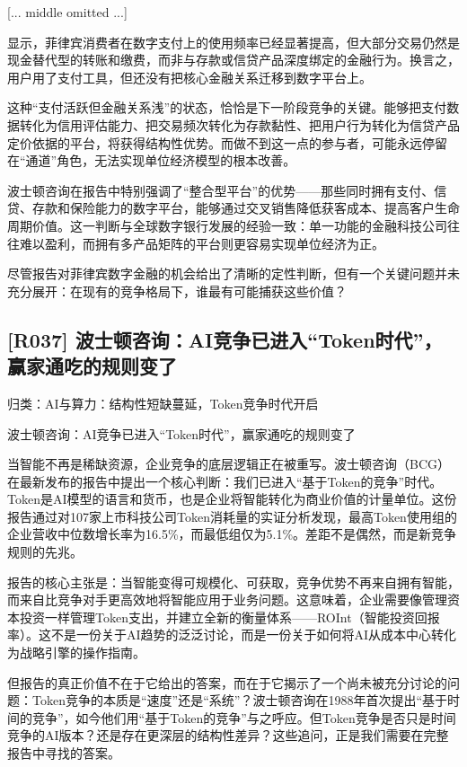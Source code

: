 \documentclass[11pt]{ctexart}
\begin{document}
[... middle omitted ...]

显示，菲律宾消费者在数字支付上的使用频率已经显著提高，但大部分交易仍然是现金替代型的转账和缴费，而非与存款或信贷产品深度绑定的金融行为。换言之，用户用了支付工具，但还没有把核心金融关系迁移到数字平台上。

这种“支付活跃但金融关系浅”的状态，恰恰是下一阶段竞争的关键。能够把支付数据转化为信用评估能力、把交易频次转化为存款黏性、把用户行为转化为信贷产品定价依据的平台，将获得结构性优势。而做不到这一点的参与者，可能永远停留在“通道”角色，无法实现单位经济模型的根本改善。

波士顿咨询在报告中特别强调了“整合型平台”的优势——那些同时拥有支付、信贷、存款和保险能力的数字平台，能够通过交叉销售降低获客成本、提高客户生命周期价值。这一判断与全球数字银行发展的经验一致：单一功能的金融科技公司往往难以盈利，而拥有多产品矩阵的平台则更容易实现单位经济为正。

尽管报告对菲律宾数字金融的机会给出了清晰的定性判断，但有一个关键问题并未充分展开：在现有的竞争格局下，谁最有可能捕获这些价值？

\subsection{[R037] 波士顿咨询：AI竞争已进入“Token时代”，赢家通吃的规则变了}
{\small\color{refgray}归类：AI与算力：结构性短缺蔓延，Token竞争时代开启}

波士顿咨询：AI竞争已进入“Token时代”，赢家通吃的规则变了

当智能不再是稀缺资源，企业竞争的底层逻辑正在被重写。波士顿咨询（BCG）在最新发布的报告中提出一个核心判断：我们已进入“基于Token的竞争”时代。Token是AI模型的语言和货币，也是企业将智能转化为商业价值的计量单位。这份报告通过对107家上市科技公司Token消耗量的实证分析发现，最高Token使用组的企业营收中位数增长率为16.5\%，而最低组仅为5.1\%。差距不是偶然，而是新竞争规则的先兆。

报告的核心主张是：当智能变得可规模化、可获取，竞争优势不再来自拥有智能，而来自比竞争对手更高效地将智能应用于业务问题。这意味着，企业需要像管理资本投资一样管理Token支出，并建立全新的衡量体系——ROInt（智能投资回报率）。这不是一份关于AI趋势的泛泛讨论，而是一份关于如何将AI从成本中心转化为战略引擎的操作指南。

但报告的真正价值不在于它给出的答案，而在于它揭示了一个尚未被充分讨论的问题：Token竞争的本质是“速度”还是“系统”？波士顿咨询在1988年首次提出“基于时间的竞争”，如今他们用“基于Token的竞争”与之呼应。但Token竞争是否只是时间竞争的AI版本？还是存在更深层的结构性差异？这些追问，正是我们需要在完整报告中寻找的答案。
\end{document}

